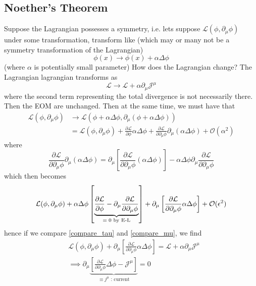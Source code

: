 \subsection{Noether's Theorem}
Suppose the Lagrangian possesses a symmetry, i.e. lets suppose $\mathcal{L}(\phi, \partial_\mu \phi)$ under some transformation, transform like (which may or many not be a symmetry transformation of the Lagrangian)
$$\phi(x) \to \phi(x) + \alpha \Delta \phi$$
(where $\alpha$ is potentially small parameter)
How does the Lagrangian change? The Lagrangian lagrangian transforms as 
\begin{equation}\label{compare_tau}
    \mathcal{L} \to \mathcal{L} + \alpha \partial_\mu \mathcal{J}^{\mu}
\end{equation}
where the second term representing the total divergence is not necessarily there. Then the EOM are unchanged. Then at the same time, we must have that
\begin{align}
    \mathcal{L} (\phi, \partial_\mu \phi) & \to \mathcal{L} (\phi + \alpha \Delta \phi, \partial_\mu (\phi + \alpha \Delta \phi)) \nonumber\\
    & =   \mathcal{L} (\phi, \partial_\mu \phi) + \frac{\partial \mathcal{L}}{\partial \phi} \alpha \Delta \phi + \frac{\partial \mathcal{L}}{\partial \partial_\mu \phi} \partial_\mu (\alpha \Delta \phi) + \mathcal{O}(\alpha^2) 
\end{align}
where 
\begin{equation}
    \frac{\partial \mathcal{L}}{\partial \partial_\mu \phi} \partial_\mu (\alpha \Delta \phi) = \partial_\mu \left[  \frac{\partial \mathcal{L}}{\partial \partial_\mu \phi}  (\alpha \Delta \phi)  \right]- \alpha \Delta \phi \partial_{\mu} \frac{\partial \mathcal{L}}{\partial  \partial_\mu \phi} 
\end{equation}
which then becomes \begin{align}\label{compare_mu}
    \mathcal{L} (\phi, \partial_\mu \phi) + \alpha \Delta \phi \left[\underbrace{ \frac{\partial \mathcal{L}}{\partial \phi} -  \partial_{\mu} \frac{\partial \mathcal{L}}{\partial \partial_\mu \phi}}_\text{$ = 0$ by E-L} \right] + \partial_\mu \left[  \frac{\partial \mathcal{L}}{\partial \partial_\mu \phi} \alpha \Delta \phi \right] + \mathcal{O} (\epsilon^2)
\end{align}
hence if we compare \eqref{compare_tau} and \eqref{compare_mu}, we find
\begin{align}
        & \mathcal{L} (\phi, \partial_\mu \phi) +  \partial_\mu \left[  \frac{\partial \mathcal{L}}{\partial \partial_\mu \phi} \alpha \Delta \phi \right] = \mathcal{L} + \alpha \partial_\mu \mathcal{J}^\mu \nonumber\\
        & \implies \partial_\mu \underbrace{\left[ \frac{\partial \mathcal{L}}{\partial \partial_\mu \phi} \Delta \phi -  \mathcal{J}^{\mu} \right]}_\text{$\equiv j^{\mu}$ : current} = 0
\end{align}
